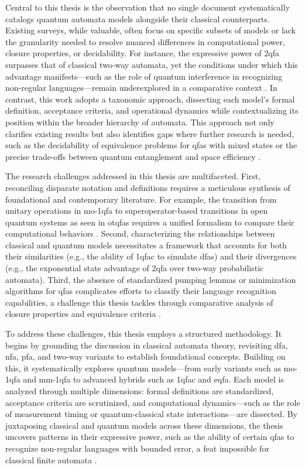 Central to this thesis is the observation that no single document systematically catalogs quantum automata models alongside their classical counterparts. Existing surveys, while valuable, often focus on specific subsets of models or lack the granularity needed to resolve nuanced differences in computational power, closure properties, or decidability. For instance, the expressive power of \gls{2qfa} surpasses that of classical two-way automata, yet the conditions under which this advantage manifests—such as the role of quantum interference in recognizing non-regular languages—remain underexplored in a comparative context \cite{yakaryilmaz2010succinctness}. In contrast, this work adopts a taxonomic approach, dissecting each model’s formal definition, acceptance criteria, and operational dynamics while contextualizing its position within the broader hierarchy of automata. This approach not only clarifies existing results but also identifies gaps where further research is needed, such as the decidability of equivalence problems for \glspl{qfa} with mixed states or the precise trade-offs between quantum entanglement and space efficiency \cite{hirvensalo2012quantum}.  

The research challenges addressed in this thesis are multifaceted. First, reconciling disparate notation and definitions requires a meticulous synthesis of foundational and contemporary literature. For example, the transition from unitary operations in \gls{mo-1qfa} to superoperator-based transitions in open quantum systems as seen in \glspl{otqfa} requires a unified formalism to compare their computational behaviors \cite{bertoni2001quantum}. Second, characterizing the relationships between classical and quantum models necessitates a framework that accounts for both their similarities (e.g., the ability of \gls{1qfac} to simulate \glspl{dfa}) and their divergences (e.g., the exponential state advantage of \gls{2qfa} over two-way probabilistic automata). Third, the absence of standardized pumping lemmas or minimization algorithms for \glspl{qfa} complicates efforts to classify their language recognition capabilities, a challenge this thesis tackles through comparative analysis of closure properties and equivalence criteria \cite{ambainis1998one}.  

To address these challenges, this thesis employs a structured methodology. It begins by grounding the discussion in classical automata theory, revisiting \gls{dfa}, \gls{nfa}, \gls{pfa}, and two-way variants to establish foundational concepts. Building on this, it systematically explores quantum models—from early variants such as \gls{mo-1qfa} \cite{moore2000quantum} and \gls{mm-1qfa} \cite{kondacs1997power} to advanced hybrids such as \gls{1qfac} and \gls{eqfa}. Each model is analyzed through multiple dimensions: formal definitions are standardized, acceptance criteria are scrutinized, and computational dynamics—such as the role of measurement timing or quantum-classical state interactions—are dissected. By juxtaposing classical and quantum models across these dimensions, the thesis uncovers patterns in their expressive power, such as the ability of certain \glspl{qfa} to recognize non-regular languages with bounded error, a feat impossible for classical finite automata \cite{ambainis2009superiority}.  

